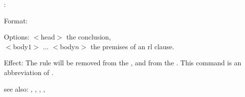 \rxrl:

Format: 

Options: $<$head$>$ the conclusion,\\
         $<$body$1>$ ... $<$body$n>$ the premises of an rl clause.

Effect: The rule  will be removed from the 
	, and  from the .
        This command is an abbreviation of .

see also: \rx, \rxup, \consult, \destroy, \replace
